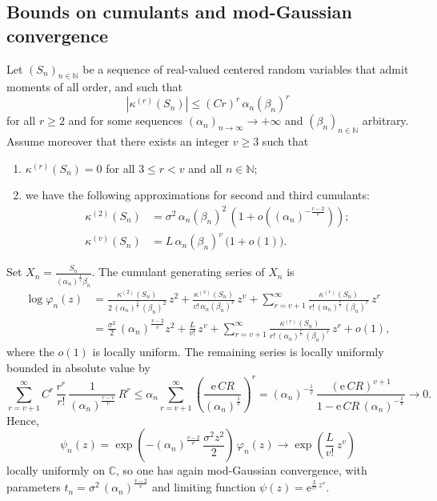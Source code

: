 \documentclass[12pt,a4paper,reqno]{amsart}
\theoremstyle{remark}
\newcommand{\N}{\mathbb{N}}
\newcommand{\C}{\mathbb{C}}
\newcommand{\E}{\mathrm{e}}
\newcommand{\alphan}{\alpha_n}
\newcommand{\betan}{\beta_n}
\begin{document}
\subsection{Bounds on cumulants and mod-Gaussian convergence}
\label{subsec:modgaussfromcumulants}
Let $(S_{n})_{n \in \N}$ be a sequence of real-valued centered random variables that admit moments of all order, and such that  
\begin{equation}
    |\kappa^{(r)}(S_{n})| \leq (Cr)^{r}\,\alphan (\betan)^r
    \label{eq:superbound}
\end{equation}
for all $r \geq 2$ and for some sequences $(\alphan)_{n \to \infty} \to +\infty$ and $(\beta_n)_{n\in \N}$ arbitrary. Assume moreover that there exists an integer $v \geq 3$ such that \vspace{2mm}
\begin{enumerate}
\item $\kappa^{(r)}(S_{n})=0$ for all $3 \leq r < v$ and all $n \in \N$;\vspace{2mm}
\item we have the following approximations for second and third cumulants:
    \begin{align}
        \kappa^{(2)}(S_{n}) &= \sigma^{2}\,\alphan (\betan)^{2}\,\left(1+o\!\left((\alphan)^{-\frac{v-2}{v}}\right)\right); \nonumber \\
        \kappa^{(v)}(S_{n}) &=L\,\alphan (\betan)^{v}\,\big(1+o(1)\big).
        \label{eq:cv_sndthrd_cumulants}
    \end{align}
\end{enumerate}
Set $X_{n}=\frac{S_{n}}{(\alphan)^{\frac{1}{v}}\betan}$. The cumulant generating series of $X_{n}$ is
\begin{align*}
\log \varphi_{n}(z)&=\frac{\kappa^{(2)}(S_{n})}{2\,(\alphan)^{\frac{2}{v}}\,(\betan)^2}\,z^{2}+\frac{\kappa^{(v)}(S_{n})}{v!\,\alphan (\betan)^{v}}\,z^{v}+\sum_{r=v+1}^{\infty} \frac{\kappa^{(r)}(S_{n})}{r!\,(\alphan)^{\frac{r}{v}}\,(\betan)^r}\,z^{r}\\
&=\frac{\sigma^{2}}{2}\,(\alphan)^{\frac{v-2}{v}}z^{2}+\frac{L}{v!}\,z^{v}+ \sum_{r=v+1}^{\infty} \frac{\kappa^{(r)}(S_{n})}{r!\,(\alphan)^{\frac{r}{v}}\,(\betan)^r}\,z^{r}+o(1),
\end{align*}
where the $o(1)$ is locally uniform. The remaining series is locally uniformly bounded in absolute value by
$$\sum_{r=v+1}^{\infty} C^{r}\,\frac{r^{r}}{r!}\, \frac{1}{(\alphan)^{\frac{r-v}{v}}}\,R^{r} \leq \alphan \sum_{r=v+1}^{\infty} \left(\frac{\E\, CR}{(\alphan)^{\frac{1}{v}}}\right)^{r}=(\alphan)^{-\frac{1}{v}}\,\frac{(\E\, CR)^{v+1}}{1-\E\, CR\,(\alphan)^{-\frac{1}{v}}} \to 0.$$
Hence, 
$$\psi_{n}(z)=\exp\left(-(\alphan)^{\frac{v-2}{v}}\,\frac{\sigma^{2}z^{2}}{2}\right)\,\varphi_{n}(z) \to \exp\left(\frac{L}{v!}\,z^{v}\right)$$
locally uniformly on $\C$, so one has again mod-Gaussian convergence, with parameters $t_{n}=\sigma^{2}\,(\alphan)^{\frac{v-2}{v}}$ and limiting function $\psi(z)=\E^{\frac{L}{v!}\,z^{v}}$.
\end{document}
